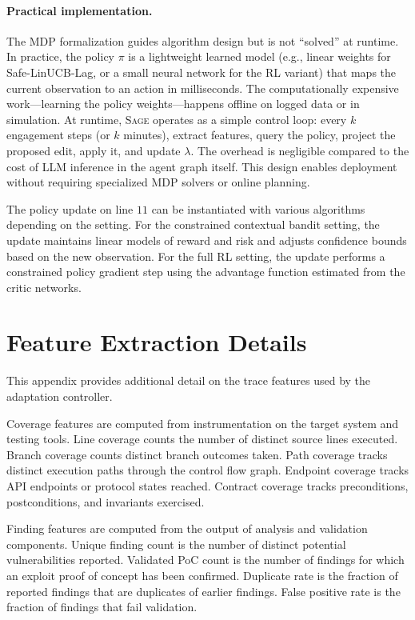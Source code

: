 \documentclass[sigconf,anonymous]{acmart}
\newcommand{\SAGE}{\textsc{Sage}\xspace}
\begin{document}
\paragraph{Practical implementation.} The MDP formalization guides algorithm design but is not ``solved'' at runtime. In practice, the policy $\pi$ is a lightweight learned model (e.g., linear weights for Safe-LinUCB-Lag, or a small neural network for the RL variant) that maps the current observation to an action in milliseconds. The computationally expensive work---learning the policy weights---happens offline on logged data or in simulation. At runtime, \SAGE operates as a simple control loop: every $k$ engagement steps (or $k$ minutes), extract features, query the policy, project the proposed edit, apply it, and update $\lambda$. The overhead is negligible compared to the cost of LLM inference in the agent graph itself. This design enables deployment without requiring specialized MDP solvers or online planning.

The policy update on line $11$ can be instantiated with various algorithms depending on the setting. For the constrained contextual bandit setting, the update maintains linear models of reward and risk and adjusts confidence bounds based on the new observation. For the full RL setting, the update performs a constrained policy gradient step using the advantage function estimated from the critic networks.

\section{Feature Extraction Details}
\label{app:features}

This appendix provides additional detail on the trace features used by the adaptation controller.

Coverage features are computed from instrumentation on the target system and testing tools. Line coverage counts the number of distinct source lines executed. Branch coverage counts distinct branch outcomes taken. Path coverage tracks distinct execution paths through the control flow graph. Endpoint coverage tracks API endpoints or protocol states reached. Contract coverage tracks preconditions, postconditions, and invariants exercised.

Finding features are computed from the output of analysis and validation components. Unique finding count is the number of distinct potential vulnerabilities reported. Validated PoC count is the number of findings for which an exploit proof of concept has been confirmed. Duplicate rate is the fraction of reported findings that are duplicates of earlier findings. False positive rate is the fraction of findings that fail validation.
\end{document}
